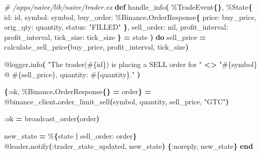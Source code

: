 \documentclass[
  oneside]{book}
\newenvironment{Shaded}{\begin{snugshade}}{\end{snugshade}}
\newcommand{\CommentTok}[1]{\textcolor[rgb]{0.56,0.35,0.01}{\textit{#1}}}
\newcommand{\ConstantTok}[1]{\textcolor[rgb]{0.56,0.35,0.01}{#1}}
\newcommand{\FunctionTok}[1]{\textcolor[rgb]{0.13,0.29,0.53}{\textbf{#1}}}
\newcommand{\KeywordTok}[1]{\textcolor[rgb]{0.13,0.29,0.53}{\textbf{#1}}}
\newcommand{\NormalTok}[1]{#1}
\newcommand{\OperatorTok}[1]{\textcolor[rgb]{0.81,0.36,0.00}{\textbf{#1}}}
\newcommand{\OtherTok}[1]{\textcolor[rgb]{0.56,0.35,0.01}{#1}}
\newcommand{\StringTok}[1]{\textcolor[rgb]{0.31,0.60,0.02}{#1}}
\newcommand{\VariableTok}[1]{\textcolor[rgb]{0.00,0.00,0.00}{#1}}
\begin{document}
\begin{Shaded}
\begin{Highlighting}[]
\CommentTok{\# /apps/naive/lib/naive/trader.ex}
  \KeywordTok{def}\NormalTok{ handle\_info}\FunctionTok{(}
\NormalTok{        \%}\ConstantTok{TradeEvent}\FunctionTok{\{\}}\NormalTok{,}
\NormalTok{        \%}\ConstantTok{State}\FunctionTok{\{}
          \VariableTok{id:}\NormalTok{ id,}
          \VariableTok{symbol:}\NormalTok{ symbol,}
          \VariableTok{buy\_order:}\NormalTok{ \%}\ConstantTok{Binance}\OperatorTok{.}\ConstantTok{OrderResponse}\FunctionTok{\{}
            \VariableTok{price:}\NormalTok{ buy\_price,}
            \VariableTok{orig\_qty:}\NormalTok{ quantity,}
            \VariableTok{status:} \StringTok{"FILLED"}
          \FunctionTok{\}}\NormalTok{,}
          \VariableTok{sell\_order:} \ConstantTok{nil}\NormalTok{,}
          \VariableTok{profit\_interval:}\NormalTok{ profit\_interval,}
          \VariableTok{tick\_size:}\NormalTok{ tick\_size}
        \FunctionTok{\}} \OperatorTok{=}\NormalTok{ state}
      \FunctionTok{)} \KeywordTok{do}
\NormalTok{    sell\_price }\OperatorTok{=}\NormalTok{ calculate\_sell\_price}\FunctionTok{(}\NormalTok{buy\_price, profit\_interval, tick\_size}\FunctionTok{)}

    \OtherTok{@logger}\OperatorTok{.}\NormalTok{info}\FunctionTok{(}
      \StringTok{"The trader(}\OtherTok{\#\{}\NormalTok{id}\OtherTok{\}}\StringTok{) is placing a SELL order for "} \OperatorTok{\textless{}\textgreater{}}
        \StringTok{"}\OtherTok{\#\{}\NormalTok{symbol}\OtherTok{\}}\StringTok{ @ }\OtherTok{\#\{}\NormalTok{sell\_price}\OtherTok{\}}\StringTok{, quantity: }\OtherTok{\#\{}\NormalTok{quantity}\OtherTok{\}}\StringTok{."}
    \FunctionTok{)}

    \FunctionTok{\{}\VariableTok{:ok}\NormalTok{, \%}\ConstantTok{Binance}\OperatorTok{.}\ConstantTok{OrderResponse}\FunctionTok{\{\}} \OperatorTok{=}\NormalTok{ order}\FunctionTok{\}} \OperatorTok{=}
      \OtherTok{@binance\_client}\OperatorTok{.}\NormalTok{order\_limit\_sell}\FunctionTok{(}\NormalTok{symbol, quantity, sell\_price, }\StringTok{"GTC"}\FunctionTok{)}

    \VariableTok{:ok} \OperatorTok{=}\NormalTok{ broadcast\_order}\FunctionTok{(}\NormalTok{order}\FunctionTok{)}

\NormalTok{    new\_state }\OperatorTok{=}\NormalTok{ \%}\FunctionTok{\{}\NormalTok{state }\OperatorTok{|} \VariableTok{sell\_order:}\NormalTok{ order}\FunctionTok{\}}
    \OtherTok{@leader}\OperatorTok{.}\NormalTok{notify}\FunctionTok{(}\VariableTok{:trader\_state\_updated}\NormalTok{, new\_state}\FunctionTok{)}
    \FunctionTok{\{}\VariableTok{:noreply}\NormalTok{, new\_state}\FunctionTok{\}}
  \KeywordTok{end}


\end{Highlighting}
\end{Shaded}
\end{document}
